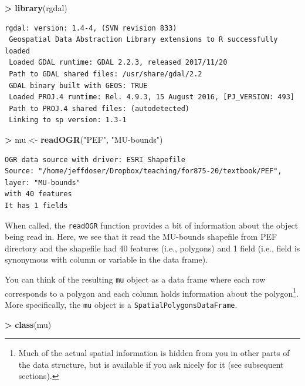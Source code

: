 \documentclass[
]{krantz}
\makeatletter
\newenvironment{Shaded}{\begin{snugshade}}{\end{snugshade}}
\newcommand{\KeywordTok}[1]{\textcolor[rgb]{0.27,0.27,0.27}{\textbf{#1}}}
\newcommand{\NormalTok}[1]{#1}
\newcommand{\OperatorTok}[1]{\textcolor[rgb]{0.43,0.43,0.43}{\textbf{#1}}}
\newcommand{\StringTok}[1]{\textcolor[rgb]{0.5,0.5,0.5}{#1}}
\newenvironment{kframe}{%
\medskip{}
\setlength{\fboxsep}{.8em}
 \def\at@end@of@kframe{}%
 \ifinner\ifhmode%
  \def\at@end@of@kframe{\end{minipage}}%
  \begin{minipage}{\columnwidth}%
 \fi\fi%
 \def\FrameCommand##1{\hskip\@totalleftmargin \hskip-\fboxsep
 \colorbox{shadecolor}{##1}\hskip-\fboxsep
     \hskip-\linewidth \hskip-\@totalleftmargin \hskip\columnwidth}%
 \MakeFramed {\advance\hsize-\width
   \@totalleftmargin\z@ \linewidth\hsize
   \@setminipage}}%
 {\par\unskip\endMakeFramed%
 \at@end@of@kframe}
\renewenvironment{Shaded}{\begin{kframe}}{\end{kframe}}
\makeatother
\begin{document}
\begin{Shaded}
\begin{Highlighting}[]
\OperatorTok{\textgreater{}}\StringTok{ }\KeywordTok{library}\NormalTok{(rgdal)}
\end{Highlighting}
\end{Shaded}

\begin{verbatim}
rgdal: version: 1.4-4, (SVN revision 833)
 Geospatial Data Abstraction Library extensions to R successfully loaded
 Loaded GDAL runtime: GDAL 2.2.3, released 2017/11/20
 Path to GDAL shared files: /usr/share/gdal/2.2
 GDAL binary built with GEOS: TRUE 
 Loaded PROJ.4 runtime: Rel. 4.9.3, 15 August 2016, [PJ_VERSION: 493]
 Path to PROJ.4 shared files: (autodetected)
 Linking to sp version: 1.3-1 
\end{verbatim}

\begin{Shaded}
\begin{Highlighting}[]
\OperatorTok{\textgreater{}}\StringTok{ }\NormalTok{mu \textless{}{-}}\StringTok{ }\KeywordTok{readOGR}\NormalTok{(}\StringTok{"PEF"}\NormalTok{, }\StringTok{"MU{-}bounds"}\NormalTok{)}
\end{Highlighting}
\end{Shaded}

\begin{verbatim}
OGR data source with driver: ESRI Shapefile 
Source: "/home/jeffdoser/Dropbox/teaching/for875-20/textbook/PEF", layer: "MU-bounds"
with 40 features
It has 1 fields
\end{verbatim}

When called, the \texttt{readOGR} function provides a bit of information about the object being read in. Here, we see that it read the MU-bounds shapefile from PEF directory and the shapefile had 40 features (i.e., polygons) and 1 field (i.e., field is synonymous with column or variable in the data frame).

You can think of the resulting \texttt{mu} object as a data frame where each row corresponds to a polygon and each column holds information about the polygon\footnote{Much of the actual spatial information is hidden from you in other parts of the data structure, but is available if you ask nicely for it (see subsequent sections).}. More specifically, the \texttt{mu} object is a \texttt{SpatialPolygonsDataFrame}.

\begin{Shaded}
\begin{Highlighting}[]
\OperatorTok{\textgreater{}}\StringTok{ }\KeywordTok{class}\NormalTok{(mu)}
\end{Highlighting}
\end{Shaded}
\end{document}
